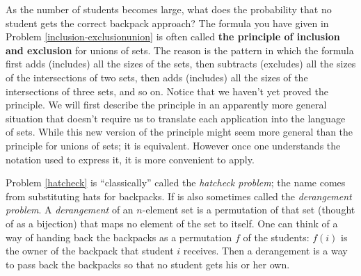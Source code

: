 \itemi As the number of students becomes large, what does the probability
that no student gets the correct backpack approach? 
  \ep
The formula you have given in Problem \ref{inclusion-exclusionunion} is
often called {\bf the principle of inclusion and
exclusion} for unions of sets.  The reason is the pattern in which
the formula first adds (includes) all the sizes of the sets, then
subtracts (excludes) all the sizes of the intersections of two sets, then
adds (includes) all the sizes of the intersections of three sets, and so
on.  Notice that we haven't yet proved the principle.  We will first
describe the principle in an apparently more general situation that
doesn't require us to translate each application into the language of
sets.  While this new version of the principle might seem more general
than the principle for unions of sets; it is equivalent.  However once one
understands the notation used to express it, it is more convenient to
apply.

Problem \ref{hatcheck} is ``classically'' called the {\em hatcheck
problem}; the name comes from substituting hats
for backpacks.  If is also sometimes called the {\em derangement
problem}.  A {\em
derangement} of an
$n$-element set is a permutation of that set (thought of as a bijection)
that maps no element of the set to itself.  One can think of a way of
handing back the backpacks as a permutation $f$ of the students: $f(i)$ is
the owner of the backpack that student $i$ receives.  Then a derangement
is a way to pass back the backpacks so that no student gets his or her
own.

